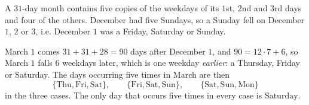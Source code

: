 A $31$-day month contains five copies of the weekdays of its $1$st, $2$nd and $3$rd days and four of the others. December had five Sundays, so a Sunday fell on December $1$, $2$ or $3$, i.e. December $1$ was a Friday, Saturday or Sunday.

March $1$ comes $31+31+28=90$ days after December $1$, and $90=12\cdot7+6$, so March $1$ falls $6$ weekdays later, which is one weekday \emph{earlier}: a Thursday, Friday or Saturday. The days occurring five times in March are then
\[\{\text{Thu},\text{Fri},\text{Sat}\},\qquad\{\text{Fri},\text{Sat},\text{Sun}\},\qquad\{\text{Sat},\text{Sun},\text{Mon}\}\]
in the three cases. The only day that occurs five times in every case is $\boxed{\text{Saturday}}$.
